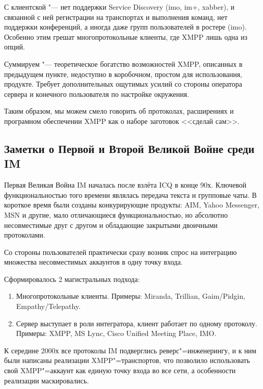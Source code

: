 \documentclass[10pt, a5paper]{article}
\begin{document}
С клиентской "--- нет поддержки Service Discovery (imo, im+, \linebreak xabber), и связанной с ней регистрации на транспортах и выполнения команд, нет поддержки конференций, а иногда даже групп пользователей в ростере (imo). Особенно этим грешат многопротокольные клиенты, где XMPP лишь одна из опций.

Суммируем "--- теоретическое богатство возможностей XMPP, \linebreak описанных в предыдущем пункте, недоступно в коробочном, простом для использования, продукте. Требует дополнительных ощутимых усилий со стороны оператора сервера и конечного пользователя по настройке окружения.

Таким образом, мы можем смело говорить об протоколах, расширениях  и програмном обеспечении XMPP как о наборе заготовок <<сделай сам>>.

\subsection*{Заметки о Первой и Второй Великой Войне среди IM}

Первая Великая Война IM началась после взлёта ICQ в конце 90х. Ключевой функциональностью того времени являлась передача текста и групповые чаты.  В короткое время были созданы конкурирующие продукты: AIM, Yahoo Messenger, MSN и другие, мало отличающиеся функциональностью, но абсолютно несовместимые друг с другом и обладающие закрытыми двоичными протоколами.

Со стороны пользователей практически сразу возник спрос на интеграцию множества несовместимых аккаунтов в одну точку входа.

Сформировалось 2 магистральных подхода:

\begin{enumerate}
  \item Многопротокольные клиенты. Примеры: Miranda, Trillian, \linebreak Gaim/Pidgin, Empathy/Telepathy.
  \item Сервер выступает в роли интегратора, клиент работает по одному протоколу. Примеры: XMPP, MS Lync, Cisco Unified Meeting Place, IMO.
\end{enumerate}

К середине 2000х все  протоколы IM подверглись реверс"=инженерингу, и к ним были написаны реализации XMPP"=транспортов, что позволило использовать свой XMPP"=аккаунт как единую точку входа во все сети, а особенности реализации маскировались.
\end{document}
